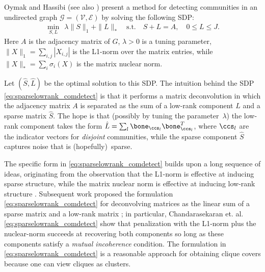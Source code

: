 Oymak and Hassibi \cite{OH:11}  (see also \cite{CJSX:14}) present a  method for  detecting communities in an undirected  graph  $\mathcal{G} = (\mathcal{V},\mathcal{E})$  by solving the 
following  SDP:
\begin{equation} \label{eq:sparselowrank_comdetect}
\begin{aligned}
\min_{S,L} ~~ \lambda \| S \|_{1} +  \| L \|_{*} \quad \mathrm{s.t.} \quad S+L = A, \quad 0 \leq L \leq J.
\end{aligned}
\end{equation}
Here     $A$ is  the adjacency matrix of $G$,  $\lambda>0$ is a tuning parameter, $\| X \|_1 = \sum_{i,j} |X_{i,j}|$ is the L1-norm over the matrix entries, while $\|X\|_* = \sum_i \sigma_i (X)$ is the matrix nuclear norm. %

  Let $(\hat{S},\hat{L})$ be the optimal solution to this SDP.   The intuition behind the %
  SDP \eqref{eq:sparselowrank_comdetect} %
is that it performs a matrix deconvolution in which the adjacency matrix $A$ is separated as the %
sum of a low-rank component $\hat{L}$ and a sparse matrix $\hat{S}$.  %
The hope is that (possibly by tuning the parameter~$\lambda$) the low-rank component takes the form $\hat{L} = \sum_{l} \bone_{\ccs_l} \bone_{\ccs_l}^T$, where $\ccs_l$ are the indicator vectors for {\em disjoint} communities, while the sparse component $\hat{S}$ captures noise that is (hopefully)~sparse.  

The specific form in \eqref{eq:sparselowrank_comdetect} builds upon a long sequence of ideas, originating from the observation that the L1-norm is effective at inducing sparse structure, while the matrix nuclear norm is effective at inducing low-rank structure \cite{CanPla:11,RFP:10}.  Subsequent work proposed the formulation \eqref{eq:sparselowrank_comdetect} for deconvolving matrices as the linear sum of a sparse matrix and a low-rank matrix \cite{CSPW:11,WPMGR:09}; in particular, Chandarasekaran et. al. \eqref{eq:sparselowrank_comdetect} show that penalization with the L1-norm plus the nuclear-norm succeeds at recovering both components so long as these components satisfy a {\em mutual incoherence} condition.  The formulation in \eqref{eq:sparselowrank_comdetect} is a reasonable approach for obtaining clique covers because one can view cliques as clusters.  
%
%

